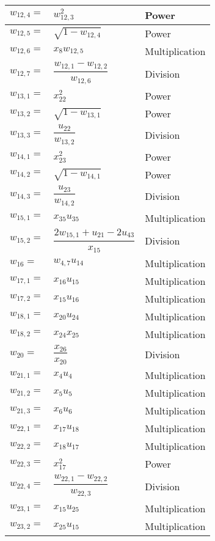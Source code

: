 \begin{longtable}{|p{1.5cm}|l|p{2cm}|}
$w_{12,4}=$ & $ w_{12,3}^{2} $ & Power \\ \hline
$w_{12,5}=$ & $ \sqrt{1-w_{12,4}} $ & Power \\ \hline
$w_{12,6}=$ & $ x_{8}w_{12,5} $ & Multiplication \\ \hline
$w_{12,7}=$ & $ \dfrac{w_{12,1}-w_{12,2}}{w_{12,6}} $ & Division \\ \hline
$w_{13,1}=$ & $ x_{22}^{2} $ & Power \\ \hline
$w_{13,2}=$ & $ \sqrt{1-w_{13,1}} $ & Power \\ \hline
$w_{13,3}=$ & $ \dfrac{u_{22}}{w_{13,2}} $ & Division \\ \hline
$w_{14,1}=$ & $ x_{23}^{2} $ & Power \\ \hline
$w_{14,2}=$ & $ \sqrt{1-w_{14,1}} $ & Power \\ \hline
$w_{14,3}=$ & $ \dfrac{u_{23}}{w_{14,2}} $ & Division \\ \hline
$w_{15,1}=$ & $ x_{35}u_{35} $ & Multiplication \\ \hline 
$w_{15,2}=$ & $ \dfrac{2w_{15,1}+u_{21}-2u_{43}}{x_{15}} $ & Division \\ \hline 
$w_{16}=$ & $ w_{4,7}u_{14} $ & Multiplication \\ \hline
$w_{17,1}=$ & $ x_{16}u_{15} $ & Multiplication \\ \hline
$w_{17,2}=$ & $ x_{15}u_{16} $ & Multiplication \\ \hline
$w_{18,1}=$ & $ x_{20}u_{24} $ & Multiplication \\ \hline
$w_{18,2}=$ & $ x_{24}x_{25} $ & Multiplication \\ \hline
$w_{20}=$ & $ \dfrac{x_{26}}{x_{20}} $ & Division \\ \hline
$w_{21,1}=$ & $ x_{4}u_{4} $ & Multiplication \\ \hline
$w_{21,2}=$ & $ x_{5}u_{5} $ & Multiplication \\ \hline
$w_{21,3}=$ & $ x_{6}u_{6} $ & Multiplication \\ \hline
$w_{22,1}=$ & $ x_{17}u_{18} $ & Multiplication \\ \hline
$w_{22,2}=$ & $ x_{18}u_{17} $ & Multiplication \\ \hline
$w_{22,3}=$ & $ x_{17}^{2} $ & Power \\ \hline
$w_{22,4}=$ & $ \dfrac{w_{22,1}-w_{22,2}}{w_{22,3}} $ & Division \\ \hline
$w_{23,1}=$ & $ x_{15}u_{25} $ & Multiplication \\ \hline
$w_{23,2}=$ & $ x_{25}u_{15} $ & Multiplication \\ \hline

\end{longtable}
